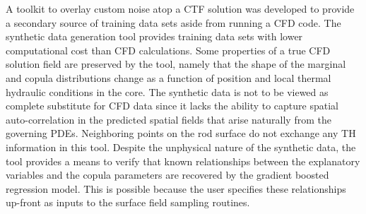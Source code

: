 A toolkit to overlay custom noise atop a CTF solution was developed to provide a secondary source of training data sets aside from running a CFD code.  The synthetic data generation tool provides training data sets with lower computational cost than CFD calculations.  Some properties of a true CFD solution field are preserved by the tool, namely that the shape of the marginal and copula distributions change as a function of position and local thermal hydraulic conditions in the core.  The synthetic data is not to be viewed as complete substitute for CFD data since it lacks the ability to capture spatial auto-correlation in the predicted spatial fields that arise naturally from the governing PDEs.  Neighboring points on the rod surface do not exchange any TH information in this tool.  Despite the unphysical nature of the synthetic data, the tool provides a means to verify that known relationships between the explanatory variables and the copula parameters are recovered by the gradient boosted regression model.  This is possible because the user specifies these relationships up-front as inputs to the surface field sampling routines. \\

